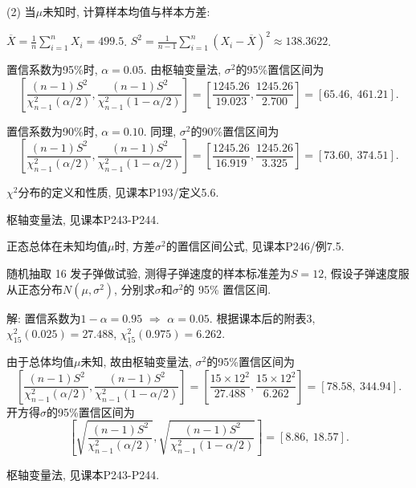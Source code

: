 \documentclass[standard]{ExBook}
\renewenvironment{shaded}{%
  \def\FrameCommand{\fboxsep=\FrameSep \colorbox{shadecolor}}%
  \MakeFramed{\advance\hsize-\width \FrameRestore}%
}{%
  \endMakeFramed
}
\begin{document}
\begin{qitems}
(2) 当$\mu$未知时, 计算样本均值与样本方差:

$\overline{X}=\frac{1}{n}\sum_{i=1}^nX_i=499.5$. 
$S^2=\frac{1}{n-1}\sum_{i=1}^n(X_i-\overline{X})^2\approx138.3622$.

置信系数为95\%时, $\alpha=0.05$. 由枢轴变量法, $\sigma^2$的95\%置信区间为
$$
\left[
\frac{(n-1)S^2}{\chi_{n-1}^2(\alpha/2)},
\frac{(n-1)S^2}{\chi_{n-1}^2(1-\alpha/2)}
\right]
=
\left[
\frac{1245.26}{19.023},
\frac{1245.26}{2.700}
\right]
=
[65.46,\ 461.21].
$$

置信系数为90\%时, $\alpha=0.10$. 同理, $\sigma^2$的90\%置信区间为
$$
\left[
\frac{(n-1)S^2}{\chi_{n-1}^2(\alpha/2)},
\frac{(n-1)S^2}{\chi_{n-1}^2(1-\alpha/2)}
\right]
=
\left[
\frac{1245.26}{16.919},
\frac{1245.26}{3.325}
\right]
=
[73.60,\ 374.51].
$$

\textcolor{themeColor}{\selectfont {} $\chi^2$分布的定义和性质, 见课本P193/定义5.6.}

\textcolor{themeColor}{\selectfont {} 枢轴变量法, 见课本P243-P244.}

\textcolor{themeColor}{\selectfont {}
正态总体在未知均值$\mu$时, 方差$\sigma^2$的置信区间公式, 见课本P246/例7.5.}

\vspace{2.5cm-5em}

    \begin{bbox}
    \begin{shaded}
        \qitem
随机抽取 16 发子弹做试验, 测得子弹速度的样本标准差为$S = 12$, 假设子弹速度服从正态分布$N(\mu,\sigma^2)$, 分别求$\sigma$和$\sigma^2$的 95\% 置信区间.
    \end{shaded}
    \end{bbox}

\vspace{\dimexpr2.5cm-5em\relax}

解: 置信系数为$1-\alpha=0.95$ $\Longrightarrow$ $\alpha=0.05$. 根据课本后的附表3,
$\chi_{15}^2(0.025)=27.488$, $\chi_{15}^2(0.975)=6.262$.

由于总体均值$\mu$未知, 故由枢轴变量法, $\sigma^2$的95\%置信区间为
$$
\left[
\frac{(n-1)S^2}{\chi_{n-1}^2(\alpha/2)},
\frac{(n-1)S^2}{\chi_{n-1}^2(1-\alpha/2)}
\right]
=
\left[
\frac{15\times12^2}{27.488},
\frac{15\times12^2}{6.262}
\right]
=
[78.58,\ 344.94].
$$
开方得$\sigma$的95\%置信区间为
$$
\left[
\sqrt{\frac{(n-1)S^2}{\chi_{n-1}^2(\alpha/2)}},
\sqrt{\frac{(n-1)S^2}{\chi_{n-1}^2(1-\alpha/2)}}
\right]
=
[8.86,\ 18.57].
$$

\textcolor{themeColor}{\selectfont {} 枢轴变量法, 见课本P243-P244.}


\end{qitems}
\end{document}
